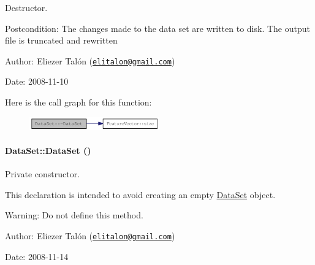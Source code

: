 Destructor. 

\begin{Desc}
\item[Postcondition:]The changes made to the data set are written to disk. The output file is truncated and rewritten\end{Desc}
\begin{Desc}
\item[Author:]Eliezer Talón (\href{mailto:elitalon@gmail.com}{\tt elitalon@gmail.com}) \end{Desc}
\begin{Desc}
\item[Date:]2008-11-10 \end{Desc}


Here is the call graph for this function:\nopagebreak
\begin{figure}[H]
\begin{center}
\leavevmode
\includegraphics[width=159pt]{class_data_set_2cdb84d32331956b413ca36933e516bd_cgraph}
\end{center}
\end{figure}
\hypertarget{class_data_set_c9b99505bafd5b1cccf8a361c3ac84a7}{
\paragraph[{DataSet}]{\setlength{\rightskip}{0pt plus 5cm}DataSet::DataSet ()}\hfill}
\label{class_data_set_c9b99505bafd5b1cccf8a361c3ac84a7}


Private constructor. 

This declaration is intended to avoid creating an empty \hyperlink{class_data_set}{DataSet} object.

\begin{Desc}
\item[Warning:]Do not define this method.\end{Desc}
\begin{Desc}
\item[Author:]Eliezer Talón (\href{mailto:elitalon@gmail.com}{\tt elitalon@gmail.com}) \end{Desc}
\begin{Desc}
\item[Date:]2008-11-14 \end{Desc}


